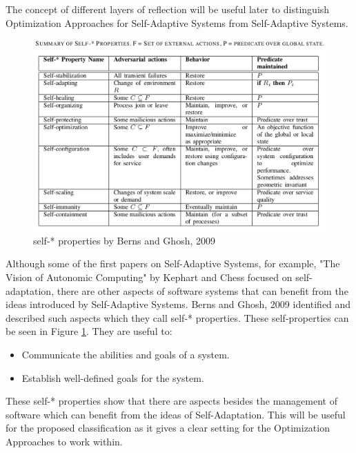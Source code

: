 The concept of different layers of reflection will be useful later to distinguish
Optimization Approaches for Self-Adaptive Systems from Self-Adaptive Systems.

\newpage
\begin{figure}[t!]
    \includegraphics[width=\textwidth]{images/SelfProperties.png}
    \caption{self-* properties by Berns and Ghosh, 2009 \cite*{DissectingSelfProperties}}
    \label{fig:SelfProperties}
\end{figure}
Although some of the first papers on Self-Adaptive Systems, for example, 
"The Vision of Autonomic Computing" by Kephart and Chess \cite*{VisionOfAutonomicComputing} focused on self-adaptation,
there are other aspects of software systems that can benefit from the ideas introduced by Self-Adaptive Systems.
Berns and Ghosh, 2009 \cite*{DissectingSelfProperties} identified and described such aspects which they call self-* properties.
These self-properties can be seen in Figure \ref{fig:SelfProperties}.
They are useful to:
\begin{itemize}
    \item Communicate the abilities and goals of a system.
    \item Establish well-defined goals for the system.
\end{itemize}

These self-* properties show that there are aspects besides the management of software which can benefit from the ideas of Self-Adaptation.
This will be useful for the proposed classification as it gives a clear setting for the Optimization Approaches to work within.

